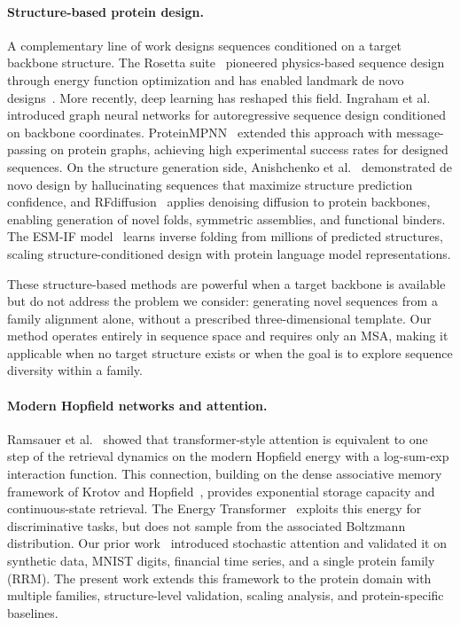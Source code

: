 \paragraph{Structure-based protein design.}
A complementary line of work designs sequences conditioned on a target backbone structure. The Rosetta suite~\cite{leaverfayRosetta3ObjectOriented2011} pioneered physics-based sequence design through energy function optimization and has enabled landmark de novo designs~\cite{huangComingAgeDeNovo2016,kuhlmanBradleyAdvances2019}. More recently, deep learning has reshaped this field. Ingraham et al.~\cite{ingrahamGenerativeModelsGraph2019} introduced graph neural networks for autoregressive sequence design conditioned on backbone coordinates. ProteinMPNN~\cite{dauparasProteinMPNN2022} extended this approach with message-passing on protein graphs, achieving high experimental success rates for designed sequences. On the structure generation side, Anishchenko et al.~\cite{anishchenkoDenovoHallucination2021} demonstrated de novo design by hallucinating sequences that maximize structure prediction confidence, and RFdiffusion~\cite{watsonRFdiffusion2023} applies denoising diffusion to protein backbones, enabling generation of novel folds, symmetric assemblies, and functional binders. The ESM-IF model~\cite{hsuInverseFolding2022} learns inverse folding from millions of predicted structures, scaling structure-conditioned design with protein language model representations.

These structure-based methods are powerful when a target backbone is available but do not address the problem we consider: generating novel sequences from a family alignment alone, without a prescribed three-dimensional template. Our method operates entirely in sequence space and requires only an MSA, making it applicable when no target structure exists or when the goal is to explore sequence diversity within a family.

\paragraph{Modern Hopfield networks and attention.}
Ramsauer et al.~\cite{ramsauerHopfieldNetworksAll2021} showed that transformer-style attention is equivalent to one step of the retrieval dynamics on the modern Hopfield energy with a log-sum-exp interaction function. This connection, building on the dense associative memory framework of Krotov and Hopfield~\cite{krotovDenseAssociativeMemory2016}, provides exponential storage capacity and continuous-state retrieval. The Energy Transformer~\cite{hooverEnergyTransformer2023} exploits this energy for discriminative tasks, but does not sample from the associated Boltzmann distribution. Our prior work~\cite{alswaidanVarnerStochasticAttention2026} introduced stochastic attention and validated it on synthetic data, MNIST digits, financial time series, and a single protein family (RRM). The present work extends this framework to the protein domain with multiple families, structure-level validation, scaling analysis, and protein-specific baselines.

